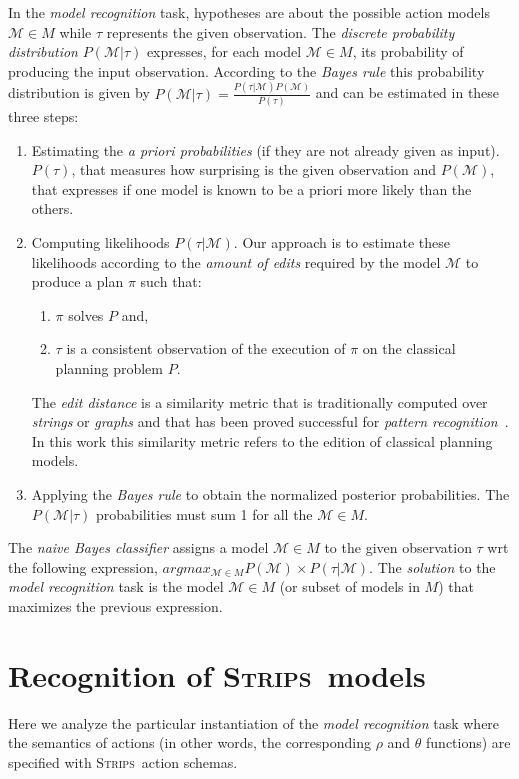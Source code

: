 \documentclass[letterpaper]{article} %
\newcommand{\strips}{\textsc{Strips}}     %
\begin{document}
In the {\em model recognition} task, hypotheses are about the possible action models $\mathcal{M}\in M$ while $\tau$ represents the given observation. The {\em discrete probability distribution} $P(\mathcal{M}|\tau)$ expresses, for each model $\mathcal{M}\in M$, its probability of producing the input observation. According to the {\em Bayes rule} this probability distribution is given by $P(\mathcal{M}|\tau)=\frac{P(\tau|\mathcal{M})P(\mathcal{M})}{P(\tau)}$ and can be estimated in these three steps:
\begin{enumerate}
\item Estimating the {\em a priori probabilities} (if they are not already given as input). $P(\tau)$, that measures how surprising is the given observation and $P(\mathcal{M})$, that expresses if one model is known to be a priori more likely than the others. 
\item Computing likelihoods $P(\tau|\mathcal{M})$.  Our approach is to estimate these likelihoods according to the {\em amount of edits} required by the model $\mathcal{M}$ to produce a plan $\pi$ such that:
\begin{enumerate}
\item $\pi$ solves $P$ and,
\item $\tau$ is a consistent observation of the execution of $\pi$ on the classical planning problem $P$. 
\end{enumerate}
The {\em edit distance} is a similarity metric that is traditionally computed over {\em strings} or {\em graphs} and that has been proved successful for {\em pattern recognition}~\cite{masek1980faster,bunke1997relation}. In this work this similarity metric refers to the edition of classical planning models.
\item Applying the {\em Bayes rule} to obtain the normalized posterior probabilities. The $P(\mathcal{M}|\tau)$ probabilities must sum 1 for all the $\mathcal{M}\in M$.
\end{enumerate}

The {\em naive Bayes classifier} assigns a model $\mathcal{M}\in M$ to the given observation $\tau$ wrt the following expression, $argmax_{\mathcal{M}\in M} P(\mathcal{M})\times P(\tau|\mathcal{M})$. The {\em solution} to the {\em model recognition} task is the model $\mathcal{M}\in M$ (or subset of models in $M$) that maximizes the previous expression.



\section{Recognition of \strips\ models}
\label{sec:asPlanning}
Here we analyze the particular instantiation of the {\em model recognition} task where the semantics of actions (in other words, the corresponding $\rho$ and $\theta$ functions) are specified with \strips\ action schemas.
\end{document}
